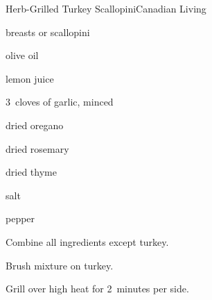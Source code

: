 \begin{recipe}{Herb-Grilled Turkey Scallopini}{Canadian Living}{}

\begin{ingredients}
\item {}  breasts or scallopini
\item {} olive oil
\item {} lemon juice
\item 3~cloves of garlic, minced
\item \tp{\half} dried oregano
\item \tp{\half} dried rosemary
\item \tp{\half} dried thyme
\item \tp{\quarter} salt
\item pepper
\end{ingredients}

\begin{directions}
\item Combine all ingredients except turkey.
\item Brush mixture on turkey.
\item Grill over high heat for 2~minutes per side.
\end{directions}

\end{recipe}
